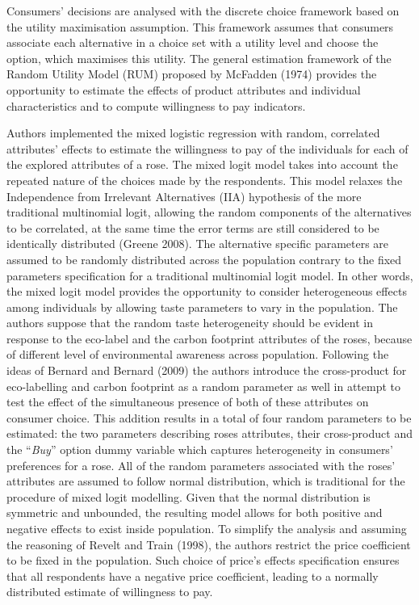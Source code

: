 \documentclass[12pt,]{article}
\begin{document}
Consumers' decisions are analysed with the discrete choice framework
based on the utility maximisation assumption. This framework assumes
that consumers associate each alternative in a choice set with a utility
level and choose the option, which maximises this utility. The general
estimation framework of the Random Utility Model (RUM) proposed by
McFadden (1974) provides the opportunity to estimate the effects of
product attributes and individual characteristics and to compute
willingness to pay indicators.

Authors implemented the mixed logistic regression with random,
correlated attributes' effects to estimate the willingness to pay of the
individuals for each of the explored attributes of a rose. The mixed
logit model takes into account the repeated nature of the choices made
by the respondents. This model relaxes the Independence from Irrelevant
Alternatives (IIA) hypothesis of the more traditional multinomial logit,
allowing the random components of the alternatives to be correlated, at
the same time the error terms are still considered to be identically
distributed (Greene 2008). The alternative specific parameters are
assumed to be randomly distributed across the population contrary to the
fixed parameters specification for a traditional multinomial logit
model. In other words, the mixed logit model provides the opportunity to
consider heterogeneous effects among individuals by allowing taste
parameters to vary in the population. The authors suppose that the
random taste heterogeneity should be evident in response to the
eco-label and the carbon footprint attributes of the roses, because of
different level of environmental awareness across population. Following
the ideas of Bernard and Bernard (2009) the authors introduce the
cross-product for eco-labelling and carbon footprint as a random
parameter as well in attempt to test the effect of the simultaneous
presence of both of these attributes on consumer choice. This addition
results in a total of four random parameters to be estimated: the two
parameters describing roses attributes, their cross-product and the
``\emph{Buy}'' option dummy variable which captures heterogeneity in
consumers' preferences for a rose. All of the random parameters
associated with the roses' attributes are assumed to follow normal
distribution, which is traditional for the procedure of mixed logit
modelling. Given that the normal distribution is symmetric and
unbounded, the resulting model allows for both positive and negative
effects to exist inside population. To simplify the analysis and
assuming the reasoning of Revelt and Train (1998), the authors restrict
the price coefficient to be fixed in the population. Such choice of
price's effects specification ensures that all respondents have a
negative price coefficient, leading to a normally distributed estimate
of willingness to pay.
\end{document}
